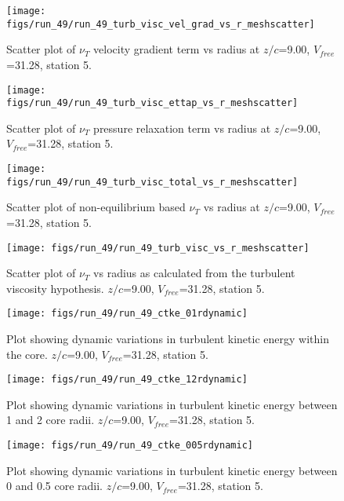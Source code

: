 \begin{figure}[H]
\centering
\texttt{[image: figs/run\_49/run\_49\_turb\_visc\_vel\_grad\_vs\_r\_meshscatter]}
\caption{Scatter plot of $\nu_T$ velocity gradient term vs radius at $z/c$=9.00, $V_{free}$=31.28, station 5.}
\end{figure}


\begin{figure}[H]
\centering
\texttt{[image: figs/run\_49/run\_49\_turb\_visc\_ettap\_vs\_r\_meshscatter]}
\caption{Scatter plot of $\nu_T$ pressure relaxation term vs radius at $z/c$=9.00, $V_{free}$=31.28, station 5.}
\end{figure}


\begin{figure}[H]
\centering
\texttt{[image: figs/run\_49/run\_49\_turb\_visc\_total\_vs\_r\_meshscatter]}
\caption{Scatter plot of non-equilibrium based $\nu_T$ vs radius at $z/c$=9.00, $V_{free}$=31.28, station 5.}
\end{figure}


\begin{figure}[H]
\centering
\texttt{[image: figs/run\_49/run\_49\_turb\_visc\_vs\_r\_meshscatter]}
\caption{Scatter plot of $\nu_T$ vs radius as calculated from the turbulent viscosity hypothesis. $z/c$=9.00, $V_{free}$=31.28, station 5.}
\end{figure}


\begin{figure}[H]
\centering
\texttt{[image: figs/run\_49/run\_49\_ctke\_01rdynamic]}
\caption{Plot showing dynamic variations in turbulent kinetic energy within the core. $z/c$=9.00, $V_{free}$=31.28, station 5.}
\end{figure}


\begin{figure}[H]
\centering
\texttt{[image: figs/run\_49/run\_49\_ctke\_12rdynamic]}
\caption{Plot showing dynamic variations in turbulent kinetic energy between 1 and 2 core radii. $z/c$=9.00, $V_{free}$=31.28, station 5.}
\end{figure}


\begin{figure}[H]
\centering
\texttt{[image: figs/run\_49/run\_49\_ctke\_005rdynamic]}
\caption{Plot showing dynamic variations in turbulent kinetic energy between 0 and 0.5 core radii. $z/c$=9.00, $V_{free}$=31.28, station 5.}
\end{figure}


